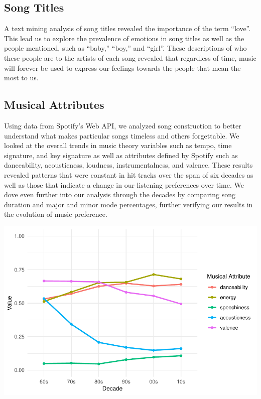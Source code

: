 \documentclass[
  12pt,
]{article}
\begin{document}
\newpage

\hypertarget{song-titles}{%
\subsection{Song Titles}\label{song-titles}}

A text mining analysis of song titles revealed the importance of the
term ``love''. This lead us to explore the prevalence of emotions in
song titles as well as the people mentioned, such as ``baby,'' ``boy,''
and ``girl''. These descriptions of who these people are to the artists
of each song revealed that regardless of time, music will forever be
used to express our feelings towards the people that mean the most to
us.

\vspace{4pt}

\hypertarget{musical-attributes}{%
\subsection{Musical Attributes}\label{musical-attributes}}

Using data from Spotify's Web API, we analyzed song construction to
better understand what makes particular songs timeless and others
forgettable. We looked at the overall trends in music theory variables
such as tempo, time signature, and key signature as well as attributes
defined by Spotify such as danceability, acousticness, loudness,
instrumentalness, and valence. These results revealed patterns that were
constant in hit tracks over the span of six decades as well as those
that indicate a change in our listening preferences over time. We dove
even further into our analysis through the decades by comparing song
duration and major and minor mode percentages, further verifying our
results in the evolution of music preference.

\begin{center}\includegraphics{Final_summary_405_majestic_capybara_files/figure-latex/unnamed-chunk-1-1} \end{center}
\end{document}
